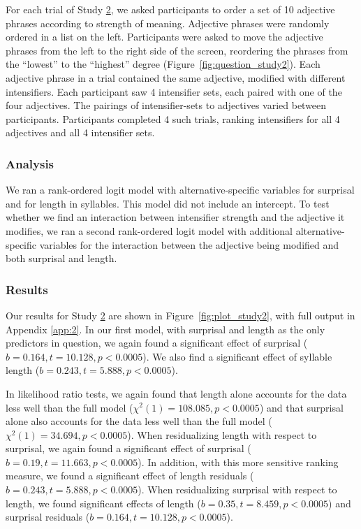 For each trial of Study \hyperref[sec:study2]{2}, we asked participants to order a set of 10 adjective phrases according to strength of meaning.
Adjective phrases were randomly ordered in a list on the left.
Participants were asked to move the adjective phrases from the left to the right side of the screen, reordering the phrases from the ``lowest'' to the ``highest'' degree (Figure~\hyperref[fig:question_study2]{\ref{fig:question_study2}}).
Each adjective phrase in a trial contained the same adjective, modified with different intensifiers.
Each participant saw 4 intensifier sets, each paired with one of the four adjectives.
The pairings of intensifier-sets to adjectives varied between participants.
Participants completed 4 such trials, ranking intensifiers for all 4 adjectives and all 4 intensifier sets.

\subsubsection{Analysis}

We ran a rank-ordered logit model \cite{beggs_assessing_1981, hausman_specifying_1987} with alternative-specific variables for surprisal and for length in syllables. This model did not include an intercept.
%
To test whether we find an interaction between intensifier strength and the adjective it modifies, we ran a second rank-ordered logit model with additional alternative-specific variables for the interaction between the adjective being modified and both surprisal and length. 

\subsubsection{Results}

Our results for Study \hyperref[sec:study2]{2} are shown in Figure~\ref{fig:plot_study2}, with full output in Appendix \ref{app:2}. In our first model, with surprisal and length as the only predictors in question, we again found a significant effect of surprisal ($b=0.164,t=10.128,p<0.0005$). We also find a significant effect of syllable length ($b=0.243,t=5.888,p<0.0005$).

In likelihood ratio tests, we again found that length alone accounts for the data less well than the full model ($\chi^2(1)=108.085, p<0.0005$) and that surprisal alone also accounts for the data less well than the full model ($\chi^2(1)=34.694, p<0.0005$).
When residualizing length with respect to surprisal, we again found a significant effect of surprisal ($b=0.19,t=11.663,p<0.0005$). In addition, with this more sensitive ranking measure, we found a significant effect of length residuals ($b=0.243,t=5.888,p<0.0005$).
When residualizing surprisal with respect to length, we found significant effects of length ($b=0.35,t=8.459,p<0.0005$) and surprisal residuals ($b=0.164,t=10.128,p<0.0005$).


